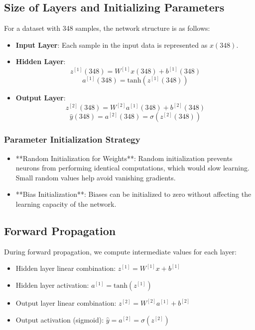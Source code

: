 \documentclass{article}
\begin{document}
\subsection{Size of Layers and Initializing Parameters}
For a dataset with 348 samples, the network structure is as follows:

\begin{itemize}
    \item \textbf{Input Layer}: Each sample in the input data is represented as $x(348)$.
    \item \textbf{Hidden Layer}: 
        \[
        z^{[1]}(348) = W^{[1]} x(348) + b^{[1]}(348)
        \]
        \[
        a^{[1]}(348) = \text{tanh}(z^{[1]}(348))
        \]
    \item \textbf{Output Layer}: 
        \[
        z^{[2]}(348) = W^{[2]} a^{[1]}(348) + b^{[2]}(348)
        \]
        \[
        \hat{y}(348) = a^{[2]}(348) = \sigma(z^{[2]}(348))
        \]
\end{itemize}

\subsubsection{Parameter Initialization Strategy} 
\begin{itemize}
    \item **Random Initialization for Weights**: Random initialization prevents neurons from performing identical computations, which would slow learning. Small random values help avoid vanishing gradients.
    \item **Bias Initialization**: Biases can be initialized to zero without affecting the learning capacity of the network.
\end{itemize}

\subsection{Forward Propagation}
During forward propagation, we compute intermediate values for each layer:
\begin{itemize}
    \item Hidden layer linear combination: $z^{[1]} = W^{[1]} x + b^{[1]}$
    \item Hidden layer activation: $a^{[1]} = \text{tanh}(z^{[1]})$
    \item Output layer linear combination: $z^{[2]} = W^{[2]} a^{[1]} + b^{[2]}$
    \item Output activation (sigmoid): $\hat{y} = a^{[2]} = \sigma(z^{[2]})$
\end{itemize}
\end{document}
